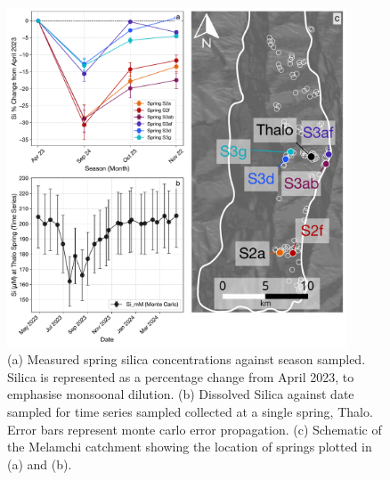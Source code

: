 \begin{figure}[h]
    \centering
    \includegraphics[width=0.9\textwidth]{Combined_Si_mM_Plots_with_Schematic.pdf}
    \caption{(a) Measured spring silica concentrations against season sampled. Silica is represented as a percentage change from April 2023, to emphasise monsoonal dilution. (b) Dissolved Silica against date sampled for time series sampled collected at a single spring, Thalo. Error bars represent monte carlo error propagation. (c) Schematic of the Melamchi catchment showing the location of springs plotted in (a) and (b).}
    \label{fig:time_series_changes}
\end{figure}

\FloatBarrier





















